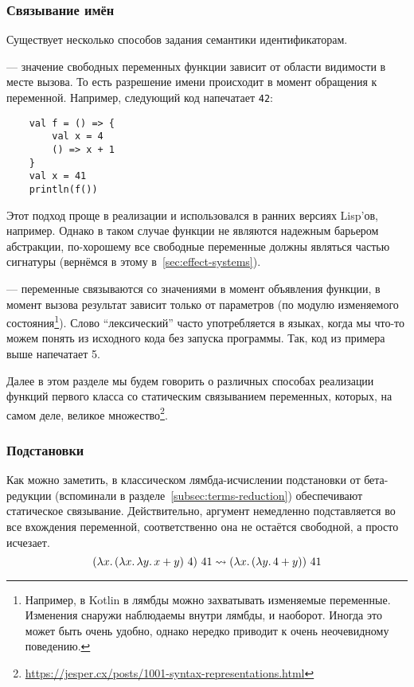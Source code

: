 \subsubsection{Связывание имён}

Существует несколько способов задания семантики идентификаторам.

 --- значение свободных переменных функции зависит от области видимости в месте вызова.
То есть разрешение имени происходит в момент обращения к переменной.
Например, следующий код напечатает \texttt{42}:
\begin{verbatim}
    val f = () => {
        val x = 4
        () => x + 1
    }
    val x = 41
    println(f())
\end{verbatim}

Этот подход проще в реализации и использовался в ранних версиях Lisp'ов, например.
Однако в таком случае функции не являются надежным барьером абстракции, по-хорошему все свободные переменные должны являться частью сигнатуры (вернёмся в этому в~\ref{sec:effect-systems}).

 --- переменные связываются со значениями в момент объявления функции, в момент вызова результат зависит только от параметров (по модулю изменяемого состояния\footnote{Например, в Kotlin в лямбды можно захватывать изменяемые переменные. Изменения снаружи наблюдаемы внутри лямбды, и наоборот. Иногда это может быть очень удобно, однако нередко приводит к очень неочевидному поведению.}).
Слово ``лексический'' часто употребляется в языках, когда мы что-то можем понять из исходного кода без запуска программы.
Так, код из примера выше напечатает 5.

Далее в этом разделе мы будем говорить о различных способах реализации функций первого класса со статическим связыванием переменных, которых, на самом деле, великое множество\footnote{\url{https://jesper.cx/posts/1001-syntax-representations.html}}.

\subsubsection{Подстановки} \label{subsubsec:substitutions}

Как можно заметить, в классическом лямбда-исчислении подстановки от бета-редукции (вспоминали в разделе~\ref{subsec:terms-reduction}) обеспечивают статическое связывание.
Действительно, аргумент немедленно подставляется во все вхождения переменной, соответственно она не остаётся свободной, а просто исчезает.
\[
    (\lambda x\ldotp (\lambda x\ldotp \lambda y\ldotp x + y) ~ 4) ~ 41 \rightsquigarrow (\lambda x\ldotp (\lambda y\ldotp 4 + y)) ~ 41
\]

